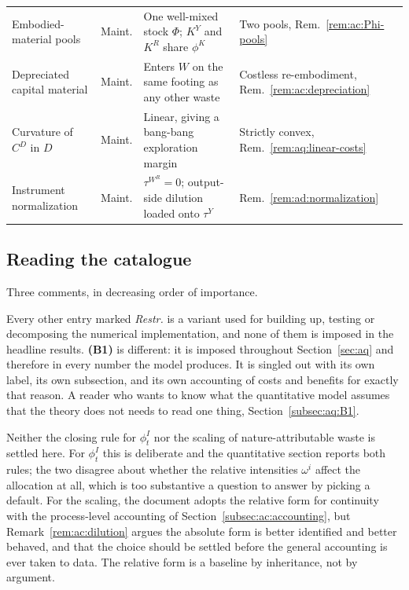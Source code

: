 \begin{table}[H]
\begin{tabular}{@{}p{}p{}p{}p{}@{}}
\addlinespace[0.2em]
Embodied-material pools
& Maint.
& One well-mixed stock $\Phi$; $K^Y$ and $K^R$ share $\phi^K$
& Two pools, Rem.~\ref{rem:ac:Phi-pools} \\
\addlinespace[0.2em]
Depreciated capital material
& Maint.
& Enters $W$ on the same footing as any other waste
& Costless re-embodiment, Rem.~\ref{rem:ac:depreciation} \\
\addlinespace[0.2em]
Curvature of $C^D$ in $D$
& Maint.
& Linear, giving a bang-bang exploration margin
& Strictly convex, Rem.~\ref{rem:aq:linear-costs} \\
\addlinespace[0.2em]
Instrument normalization
& Maint.
& $\tau^{W^R}=0$; output-side dilution loaded onto $\tau^Y$
& Rem.~\ref{rem:ad:normalization} \\
\bottomrule
\end{tabular}
\end{table}

\subsection{Reading the catalogue}
\label{subsec:baseline:reading}

Three comments, in decreasing order of importance.

 Every other entry marked \emph{Restr.} is a variant used for building up, testing or decomposing the numerical implementation, and none of them is imposed in the headline results. \textbf{(B1)} is different: it is imposed throughout Section~\ref{sec:aq} and therefore in every number the model produces. It is singled out with its own label, its own subsection, and its own accounting of costs and benefits for exactly that reason. A reader who wants to know what the quantitative model assumes that the theory does not needs to read one thing, Section~\ref{subsec:aq:B1}.

 Neither the closing rule for $\phi^I_t$ nor the scaling of nature-attributable waste is settled here. For $\phi^I_t$ this is deliberate and the quantitative section reports both rules; the two disagree about whether the relative intensities $\omega^i$ affect the allocation at all, which is too substantive a question to answer by picking a default. For the scaling, the document adopts the relative form for continuity with the process-level accounting of Section~\ref{subsec:ac:accounting}, but Remark~\ref{rem:ac:dilution} argues the absolute form is better identified and better behaved, and that the choice should be settled before the general accounting is ever taken to data. The relative form is a baseline by inheritance, not by argument.

